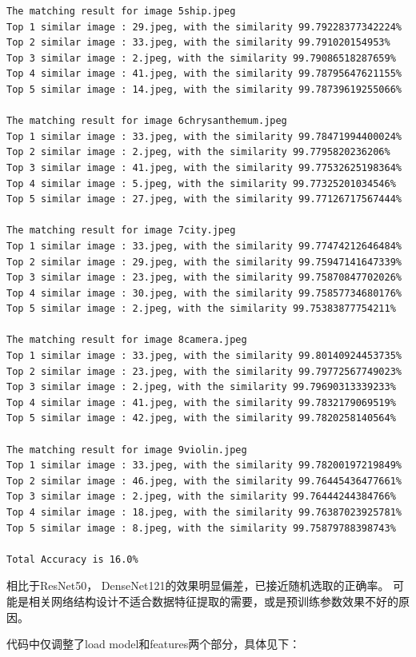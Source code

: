 \documentclass{article}
\begin{document}
\begin{lstlisting}
The matching result for image 5ship.jpeg
Top 1 similar image : 29.jpeg, with the similarity 99.79228377342224%
Top 2 similar image : 33.jpeg, with the similarity 99.791020154953%
Top 3 similar image : 2.jpeg, with the similarity 99.79086518287659%
Top 4 similar image : 41.jpeg, with the similarity 99.78795647621155%
Top 5 similar image : 14.jpeg, with the similarity 99.78739619255066%

The matching result for image 6chrysanthemum.jpeg
Top 1 similar image : 33.jpeg, with the similarity 99.78471994400024%
Top 2 similar image : 2.jpeg, with the similarity 99.7795820236206%
Top 3 similar image : 41.jpeg, with the similarity 99.77532625198364%
Top 4 similar image : 5.jpeg, with the similarity 99.77325201034546%
Top 5 similar image : 27.jpeg, with the similarity 99.77126717567444%

The matching result for image 7city.jpeg
Top 1 similar image : 33.jpeg, with the similarity 99.77474212646484%
Top 2 similar image : 29.jpeg, with the similarity 99.75947141647339%
Top 3 similar image : 23.jpeg, with the similarity 99.75870847702026%
Top 4 similar image : 30.jpeg, with the similarity 99.75857734680176%
Top 5 similar image : 2.jpeg, with the similarity 99.75383877754211%

The matching result for image 8camera.jpeg
Top 1 similar image : 33.jpeg, with the similarity 99.80140924453735%
Top 2 similar image : 23.jpeg, with the similarity 99.79772567749023%
Top 3 similar image : 2.jpeg, with the similarity 99.79690313339233%
Top 4 similar image : 41.jpeg, with the similarity 99.7832179069519%
Top 5 similar image : 42.jpeg, with the similarity 99.7820258140564%

The matching result for image 9violin.jpeg
Top 1 similar image : 33.jpeg, with the similarity 99.78200197219849%
Top 2 similar image : 46.jpeg, with the similarity 99.76445436477661%
Top 3 similar image : 2.jpeg, with the similarity 99.76444244384766%
Top 4 similar image : 18.jpeg, with the similarity 99.76387023925781%
Top 5 similar image : 8.jpeg, with the similarity 99.75879788398743%

Total Accuracy is 16.0%
\end{lstlisting}

    相比于ResNet50， DenseNet121的效果明显偏差，已接近随机选取的正确率。
    可能是相关网络结构设计不适合数据特征提取的需要，或是预训练参数效果不好的原因。

    代码中仅调整了load model和features两个部分，具体见下：
\end{document}
